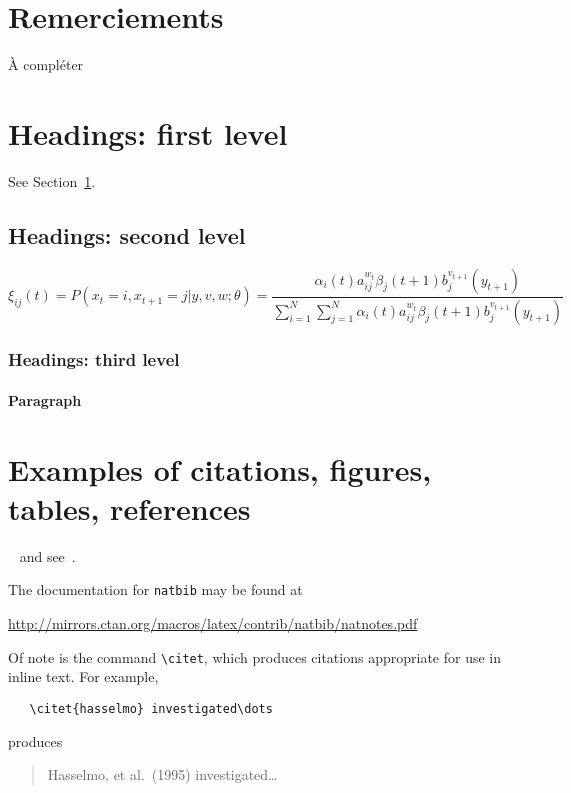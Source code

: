 \documentclass{article}
\begin{document}
  \section*{Remerciements}
  À compléter

  
  




  \section{Headings: first level}
  \label{sec:headings}

  \lipsum[4] See Section~\ref{sec:headings}.

  \subsection{Headings: second level}
  \label{subsec:headings:second-level}
  \lipsum[5]
  \begin{equation}
    \xi _{ij}(t)=P(x_{t}=i,x_{t+1}=j|y,v,w;\theta)= {\frac {\alpha _{i}(t)a^{w_t}_{ij}\beta _{j}(t+1)b^{v_{t+1}}_{j}(y_{t+1})}{\sum _{i=1}^{N} \sum _{j=1}^{N} \alpha
    _{i}(t)a^{w_t}_{ij}\beta _{j}(t+1)b^{v_{t+1}}_{j}(y_{t+1})}}\label{eq:eq1}
  \end{equation}

  \subsubsection{Headings: third level}
  \lipsum[6]

  \paragraph{Paragraph}
  \lipsum[7]


  \section{Examples of citations, figures, tables, references}
  \label{sec:others}
  \lipsum[8]~\cite{kour2014real,kour2014fast} and see~\cite{hadash2018estimate}.

  The documentation for \verb+natbib+ may be found at
  \begin{center}
    \url{http://mirrors.ctan.org/macros/latex/contrib/natbib/natnotes.pdf}
  \end{center}
  Of note is the command \verb+\citet+, which produces citations
  appropriate for use in inline text. For example,
  \begin{verbatim}
   \citet{hasselmo} investigated\dots
  \end{verbatim}
  produces
  \begin{quote}
    Hasselmo, et al.\ (1995) investigated\dots
  \end{quote}
\end{document}
